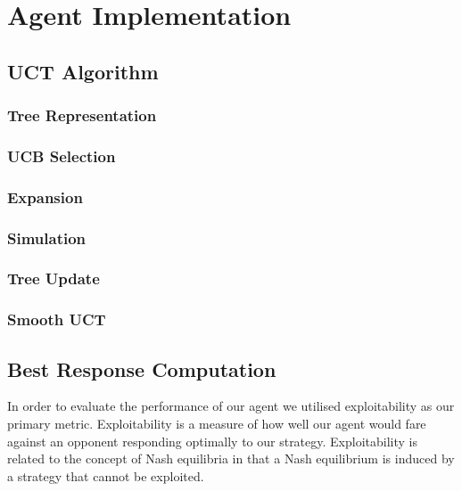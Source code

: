 \chapter{Agent Implementation}\label{ch:development}

\section{UCT Algorithm}\label{sec:MCTS}

\subsection{Tree Representation}\label{subsec:treeRepresentation}

\subsection{UCB Selection}\label{subsec:selection}

\subsection{Expansion}\label{subsec:expansion}

\subsection{Simulation}\label{subsec:simulation}

\subsection{Tree Update}\label{subsec:treeUpdate}

\subsection{Smooth UCT}\label{subsec:smoothUCT}

\section{Best Response Computation}\label{sec:bestResponseComputation}
In order to evaluate the performance of our agent we utilised exploitability as our primary metric.
Exploitability is a measure of how well our agent would fare against an opponent responding
optimally to our strategy.
Exploitability is related to the concept of Nash equilibria in that a Nash equilibrium
is induced by a strategy that cannot be exploited.

